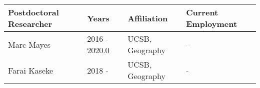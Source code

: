 
\begin{longtable}{lp{1.5cm} p{3.5cm}p{4.5cm}}
Postdoctoral Researcher & Years & Affiliation & Current Employment\\
\hline 
\endhead 
Marc Mayes & 2016 - 2020.0 & UCSB, Geography &  -   \\
Farai Kaseke & 2018 -  & UCSB, Geography &  -   \\
\end{longtable}


